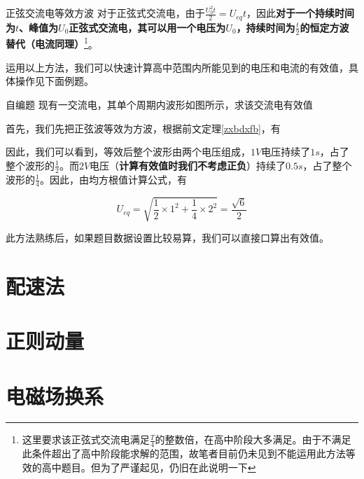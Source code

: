 \begin{theo}[label=zxbdxfb]{正弦交流电等效方波}{}
对于正弦式交流电，由于$\frac{U_0^2 t}{2} = U_{eq} t$，因此\textbf{对于一个持续时间为$t$、峰值为$U_0$正弦式交流电，其可以用一个电压为$U_0$，持续时间为$\frac{t}{2}$的恒定方波替代（电流同理）}\footnote{这里要求该正弦式交流电满足$\frac{T}{4}$的整数倍，在高中阶段大多满足。由于不满足此条件超出了高中阶段能求解的范围，故笔者目前仍未见到不能运用此方法等效的高中题目。但为了严谨起见，仍旧在此说明一下}。
\end{theo}



运用以上方法，我们可以快速计算高中范围内所能见到的电压和电流的有效值，具体操作见下面例题。

\begin{ep}{自编题}{}
现有一交流电，其单个周期内波形如图所示，求该交流电有效值



首先，我们先把正弦波等效为方波，根据前文定理\eqref{zxbdxfb}，有



因此，我们可以看到，等效后整个波形由两个电压组成，$1V$电压持续了$1s$，占了整个波形的$\frac{1}{2}$。而$2V$电压（\textbf{计算有效值时我们不考虑正负}）持续了$0.5s$，占了整个波形的$\frac{1}{4}$。因此，由均方根值计算公式，有

$$U_{eq} = \sqrt{\frac{1}{2} \times 1^2 + \frac{1}{4} \times 2^2} = \frac{\sqrt{6}}{2}$$

此方法熟练后，如果题目数据设置比较易算，我们可以直接口算出有效值。

\end{ep}

\section{配速法}

\section{正则动量}

\section{电磁场换系}